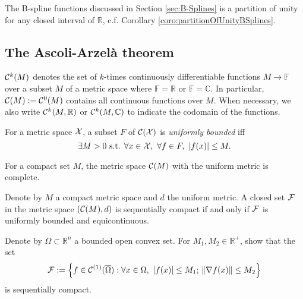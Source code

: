 \begin{exm}
  \label{exm:B-splineAsPartOfUnity}
  The B-spline functions discussed in Section \ref{sec:B-Splines}
  is a partition of unity
  for any closed interval of $\mathbb{R}$,
  c.f. Corollary \ref{coro:partitionOfUnityBSplines}.
\end{exm}

\subsection{The Ascoli-Arzel\`{a} theorem}
\label{sec:ascoli-arzela-theor}

\begin{ntn}
  \label{ntn:setOfContinuousScalarFuncs}
  ${\cal C}^{k}(M)$
  denotes the set of $k$-times continuously differentiable functions
  $M\rightarrow \mathbb{F}$
  over a subset $M$ of a metric space where $\mathbb{F}=\mathbb{R}$
  or $\mathbb{F}=\mathbb{C}$.
  In particular, 
  ${\cal C}(M):={\cal C}^{0}(M)$
  contains all continuous functions over $M$.
  When necessary, we also write ${\cal C}^k(M,\mathbb{R})$
  or ${\cal C}^k(M,\mathbb{C})$
  to indicate the codomain of the functions. 
\end{ntn}

\begin{defn}
  \label{def:uniformBoundedSetInFuncMetricSpace}
  For a metric space ${\cal X}$, 
  a subset $F$ of ${\cal C}({\cal X})$ is \emph{uniformly bounded}
  iff
  \begin{equation}
    \label{eq:uniformBoundedSetInFuncMetricSpace}
    \exists M>0 \text{ s.t. }
    \forall x\in {\cal X},\ \forall f \in F,\ 
    |f(x)| \le M.
  \end{equation}
\end{defn}

\begin{lem}
  \label{lem:completeMetricSpaceForCompactSet}
  For a compact set $M$,
  the metric space ${\cal C}(M)$
  with the uniform metric is complete.
\end{lem}

\begin{thm}
  \label{thm:Ascoli-Arzela}
  Denote by $M$ a compact metric space
  and $d$ the uniform metric. 
  A closed set ${\cal F}$ in the metric space $({\cal C}(M),d)$
  is sequentially compact
  if and only if ${\cal F}$ is uniformly bounded and equicontinuous. 
\end{thm}

\begin{exc}
  \label{exc:equiContInRn2Compact}
  Denote by $\Omega\subset \mathbb{R}^n$ a bounded open convex set.
  For $M_1,M_2\in\mathbb{R}^+$,
  show that the set
  \begin{equation}
    \label{eq:equiContInRn2Compact}
    {\cal F} := \left\{f\in {\cal C}^{(1)}(\overline{\Omega}) :
      \forall x\in \Omega,\ |f(x)|\le M_1;\, 
      \|\nabla f(x)\|\le M_2
    \right\}
  \end{equation}
  is sequentially compact.
\end{exc}

